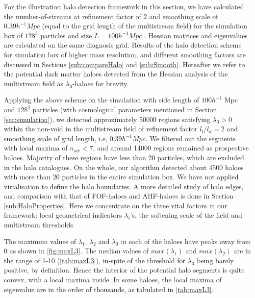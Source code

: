 \documentclass[fleqn,usenatbib,useAMS]{mnras}
\begin{document}
{For the illustration halo detection framework in this section, we have calculated the number-of-streams at refinement factor of $2$ and smoothing scale of $0.39 h^{-1} Mpc$ (equal to the grid length of the multistream field) for the simulation box of $128^3$ particles and size $L = 100 h^{-1} Mpc$ . Hessian matrices and eigenvalues are calculated on the same diagnosis grid. Results of the halo detection scheme for simulation box of higher mass resolution, and different smoothing factors are discussed in Sections \ref{sub:compareHalo} and \ref{sub:Smooth}. Hereafter we refer to the potential dark matter haloes detected from the Hessian analysis of the multistream field as $\lambda_3$-haloes for brevity. 
 

Applying the above scheme on the simulation with side length of $100 h^{-1}$ Mpc and $128^3$ particles (with cosmological parameters mentioned in Section \ref{sec:simulation}), we detected approximately 50000 regions satisfying $\lambda_3 > 0$ within the non-void in the multistream field of refinement factor $l_l/l_d = 2$ and smoothing scale of grid length, i.e, $0.39 h^{-1} Mpc$. We filtered out the segments with local maxima of $n_{str} < 7$, and around 14000 regions remained as prospective haloes. Majority of these regions have less than 20 particles, which are excluded in the halo catalogues. On the whole, our algorithm detected about 4500 haloes with more than 20 particles in the entire simulation box. We have not applied virialisation to define the halo boundaries. A more detailed study of halo edges, and comparison with that of FOF-haloes and AHF-haloes is done in Section \ref{sub:HaloProperties}. Here we concentrate on the three vital factors in our framework: local geometrical indicators $\lambda_i$'s, the softening scale of the field and multistream thresholds.

The maximum values of $\lambda_1$, $\lambda_2$ and $\lambda_3$ in each of the haloes have peaks away from 0 as shown in \autoref{fig:maxL3}. The median values of $max(\lambda_1)$ and $max(\lambda_2)$ are in the range of 1-10 (\autoref{tab:maxL3}), in-spite of the threshold for $\lambda_3$ being barely positive, by definition. Hence the interior of the potential halo segments is quite convex, with a local maxima inside. In some haloes, the local maxima of eigenvalue are in the order of thousands, as tabulated in \autoref{tab:maxL3}. 


}
\end{document}
